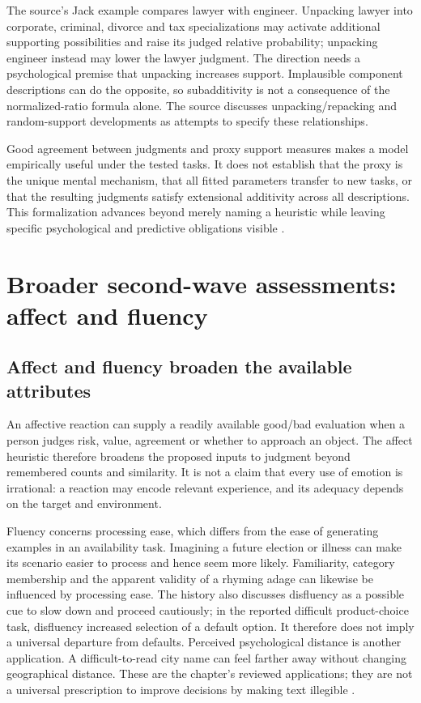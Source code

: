 The source's Jack example compares lawyer with engineer. Unpacking lawyer
into corporate, criminal, divorce and tax specializations may activate
additional supporting possibilities and raise its judged relative
probability; unpacking engineer instead may lower the lawyer judgment.
The direction needs a psychological premise that unpacking increases
support. Implausible component descriptions can do the opposite, so
subadditivity is not a consequence of the normalized-ratio formula alone.
The source discusses unpacking/repacking and random-support developments
as attempts to specify these relationships.

Good agreement between judgments and proxy support measures makes a
model empirically useful under the tested tasks. It does not establish
that the proxy is the unique mental mechanism, that all fitted parameters
transfer to new tasks, or that the resulting judgments satisfy extensional
additivity across all descriptions. This formalization advances beyond
merely naming a heuristic while leaving specific psychological and
predictive obligations visible
\cite[p.~338]{GriffinEtAl2012HeuristicsHistory}.

\section{Broader second-wave assessments: affect and fluency}
\label{sec:p19-hph-affect-fluency}

\subsection{Affect and fluency broaden the available attributes}

An affective reaction can supply a readily available good/bad evaluation
when a person judges risk, value, agreement or whether to approach an
object. The affect heuristic therefore broadens the proposed inputs to
judgment beyond remembered counts and similarity. It is not a claim
that every use of emotion is irrational: a reaction may encode relevant
experience, and its adequacy depends on the target and environment.

Fluency concerns processing ease, which differs from the ease of
generating examples in an availability task. Imagining a future election
or illness can make its scenario easier to process and hence seem more
likely. Familiarity, category membership and the apparent validity of a
rhyming adage can likewise be influenced by processing ease. The history
also discusses disfluency as a possible cue to slow down and proceed
cautiously; in the reported difficult product-choice task, disfluency
increased selection of a default option. It therefore does not imply
a universal departure from defaults. Perceived psychological distance
is another application. A difficult-to-read city name can feel farther away without
changing geographical distance. These are the chapter's reviewed
applications; they are not a universal prescription to improve decisions
by making text illegible
\cite[p.~339]{GriffinEtAl2012HeuristicsHistory}.

